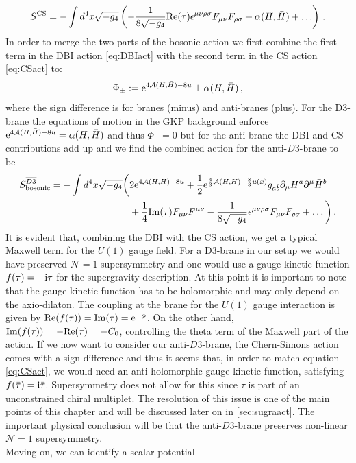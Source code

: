 \documentclass[a4paper,12pt,twoside,openright]{report}
\newcommand{\be}{\begin{equation}}
\newcommand{\ee}{\end{equation}}
\newcommand{\bea}{\begin{equation}\begin{aligned}}
\newcommand{\eea}{\end{aligned}\end{equation}}
\def\rmi{{\rm i}}
\def\rme{{\rm e}}
\def\rmre{{\rm Re}}
\def\rmim{{\rm Im}}
\begin{document}
\be 
S^{\text{CS}}=-\int d^4x \sqrt{-g_4} \left(-\frac{1}{8 \sqrt{-g_4}}\rmre(\tau) \epsilon^{\mu \nu \rho \sigma} F_{\mu \nu} F_{\rho \sigma} + \alpha(H,\bar{H}) + \ldots \right)\,.
\label{eq:CSact}
\ee
In order to merge the two parts of the bosonic action we first combine the first term in the DBI action \eqref{eq:DBIact} with the second term in the CS action \eqref{eq:CSact} to:
\be 
\Phi_\pm := \rme^{4\mathcal{A}(H,\bar{H})-8u} \pm \alpha(H,\bar{H})\,,
\ee
where the sign difference is for branes (minus) and anti-branes (plus). For the D3-brane the equations of motion in the GKP background enforce  $\rme^{4\mathcal{A}(H,\bar{H})-8u} = \alpha(H,\bar{H})$ and thus $\Phi_-=0$ but for the anti-brane the DBI and CS contributions add up and we find the combined action for the anti-$D3$-brane to be
\bea 
S^{\overline{D3}}_{\text{bosonic}}= -\int d^4x \sqrt{-g_4} \bigg(&2 \rme^{4\mathcal{A}(H,\bar{H})-8u} + \frac{1}{2} \rme^{\frac{4}{3} \mathcal{A}(H,\bar{H})-\frac{8}{3} u(x)} g_{a\bar{b}} \partial_\mu H^a \partial^\mu \bar{H}^{\bar{b}} \\&+ \frac{1}{4} \rmim(\tau)F_{\mu\nu} F^{\mu \nu} - \frac{1}{8 \sqrt{-g_4}} \epsilon^{\mu \nu \rho \sigma} F_{\mu \nu} F_{\rho \sigma} + \ldots \bigg)\,.
\label{eq:simpbosact}
\eea 
It is evident that, combining the DBI with the CS action, we get a typical Maxwell term for the $U(1)$ gauge field.  For a D3-brane in our setup we would have preserved $\mathcal{N}=1$ supersymmetry and one would use a gauge kinetic function $f(\tau)=-\rmi \tau$ for the supergravity description. At this point it is important to note that the gauge kinetic function has to be holomorphic and may only depend on the axio-dilaton. The coupling at the brane for the $U(1)$ gauge interaction is given by $\rmre(f(\tau)) = \rmim(\tau) = \rme^{-\phi}$. On the other hand, $\rmim(f(\tau)) = - \rmre(\tau) = -C_0$, controlling the theta term of the Maxwell part of the action. If we now want to consider our anti-$D3$-brane, the Chern-Simons action comes with a sign difference and thus it seems that, in order to match equation \eqref{eq:CSact}, we would need an anti-holomorphic gauge kinetic function, satisfying $f(\bar{\tau})= \rmi \bar{\tau}$. Supersymmetry does not allow for this since $\tau$ is part of an unconstrained chiral multiplet. The resolution of this issue is one of the main points of this chapter and will be discussed later on in \ref{sec:sugraact}. The important physical conclusion will be that the anti-$D3$-brane preserves non-linear $\mathcal{N}=1$ supersymmetry.\\
Moving on, we can identify a scalar potential
\end{document}
